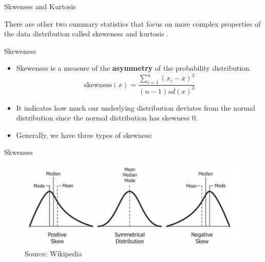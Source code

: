 \documentclass[handout]{beamer}
\begin{document}
\begin{frame}{Skweness and Kurtosis}
\scriptsize{
There are other two summary statistics that focus on more complex properties of the data distribution called skeweness and kurtosis \cite{pipis_2020}.
\begin{block}{Skeweness}
\begin{itemize}
 \item Skeweness is a measure of the \textbf{asymmetry} of the probability distribution.  
 \begin{displaymath}
  \text{skewness}(x) = \frac{\sum_{i=1}^{n}(x_i-\overline{x})^3}{(n-1)sd(x)^3}
 \end{displaymath}

 
 \item It indicates how much our underlying distribution deviates from the normal distribution since the normal distribution has skewness 0.
 \item  Generally, we have three types of skewness:
 

\end{itemize}


\end{block}




}
 
\end{frame}


\begin{frame}{Skweness}


   \begin{figure}[h!]
	\centering
	\includegraphics[scale=0.68]{pics/skewness.png}
     \caption{Source: Wikipedia}
	\end{figure} 




 
\end{frame}
\end{document}
